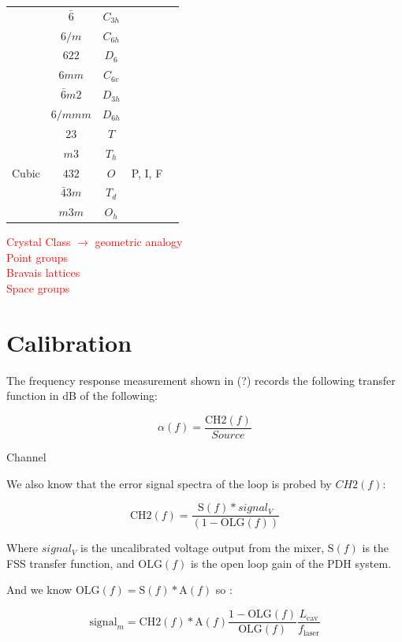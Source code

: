 \begin{center}
\begin{tabular}{|c|c|c|c|c|}
& $\bar{6}$ & $C_{3h}$ &  \\
& $6/m$ & $C_{6h}$ & \\
& $622$ & $D_6$ & \\
& $6mm$ & $C_{6v}$ &  \\
& $\bar{6}m2$ & $D_{3h}$ &  \\
& $6/mmm$ & $D_{6h}$ &  \\ \hline
\multirow{5}{10em}{Cubic} & $23$ & $T$ & \multirow{5}{8em}{P, I, F} \\
& $m3$ & $T_h$ & \\
& $432$ & $O$ & \\
& $\bar{4}3m$ & $T_d$ & \\
& $m3m$ & $O_h$ & \\
\hline
\end{tabular}
\end{center}
\textcolor{red}{Crystal Class $\rightarrow$ geometric analogy}
\\
\textcolor{red}{Point groups}
\\
\textcolor{red}{Bravais lattices}
\\
\textcolor{red}{Space groups}

\section{Calibration}
The frequency response measurement shown in (?) records the following transfer function in dB of the following:

\begin{equation}
\alpha(f) = \frac{\mathrm{CH2}(f)}{Source}
\end{equation}

Channel

We also know that the error signal spectra of the loop is probed by $CH2(f)$:


\begin{equation}
\mathrm{CH2}(f) = \frac{\mathrm{S}(f)*signal_V}{(1-\mathrm{OLG}(f))}
\end{equation}

Where $signal_V$ is the uncalibrated voltage output from the mixer, $\mathrm{S}(f)$ is the FSS transfer function, and $\mathrm{OLG}(f)$ is the open loop gain of the PDH system.

And we know $\mathrm{OLG}(f) = \mathrm{S}(f)*\mathrm{A}(f)$ so :

\begin{equation}
\mathrm{signal}_m = \mathrm{CH2}(f)*\mathrm{A}(f) \frac{1-\mathrm{OLG}(f)}{\mathrm{OLG}(f)} \frac{L_\mathrm{cav}}{f_\mathrm{laser}}
\end{equation}

